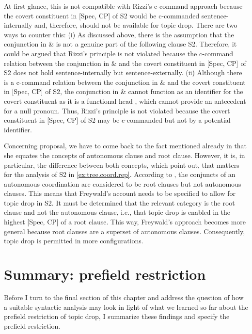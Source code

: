 At first glance, this is not compatible with Rizzi's c-command  approach because the covert constituent in [Spec, CP] of S2 would be c-commanded  sentence-internally and, therefore, should not be available for topic drop.
There are two ways to counter this:
(i) As discussed above, there is the assumption that the conjunction in \& is not a genuine part of the following clause S2.
Therefore, it could be argued that Rizzi's principle is not violated because the c-command  relation between the conjunction in \& and the covert constituent in [Spec, CP] of S2 does not hold sentence-internally but sentence-externally.
(ii) Although there is a c-command  relation between the conjunction in \& and the covert constituent in [Spec, CP] of S2, the conjunction in \& cannot function as an identifier for the covert constituent as it is a functional head \citep{johannessen1998}, which cannot provide an antecedent  for a null pronoun.
Thus, Rizzi's principle is not violated because the covert constituent in [Spec, CP] of S2 may be c-commanded  but not by a potential identifier.

Concerning  proposal, we have to come back to the fact mentioned already in  that she equates the concepts of autonomous clause and root clause.
However, it is, in particular, the difference between both concepts, which \citet{reich.reis2013} point out, that matters for the analysis of S2 in \ref{ex:tree.coord.rep}.
According to \citet[542]{reich.reis2013}, the conjuncts of an autonomous coordination are considered to be root clauses but not autonomous clauses.
This means that Freywald's account needs to be specified to allow for topic drop in S2.
It must be determined that the relevant category is the root clause and not the autonomous clause, i.e., that topic drop is enabled in the highest [Spec, CP] of a root clause.
This way, Freywald's approach becomes more general because root clauses are a superset of autonomous clauses.
Consequently, topic drop is permitted in more configurations.    

\section{Summary: prefield restriction}\label{sec:top.pf.summary}
\largerpage[-1]
Before I turn to the final section of this chapter and address the question of how a suitable syntactic analysis may look in light of what we learned so far about the prefield restriction of topic drop, I summarize these findings and specify the prefield restriction.


